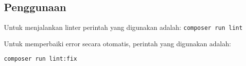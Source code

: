 \subsection{Penggunaan}
Untuk menjalankan linter perintah yang digunakan adalah:
	\verb|composer run lint|    

Untuk memperbaiki error secara otomatis, perintah yang digunakan adalah:

	\verb|composer run lint:fix|    

\begin{comment}
\subsection{Tabel}  
Berikut adalah contoh pembuatan tabel. 
Penempatan tabel dan gambar secara umum diatur secara otomatis oleh \LaTeX{}, perhatikan contoh di file bab2.tex untuk melihat bagaimana cara memaksa tabel ditempatkan sesuai keinginan kita.

Perhatikan bawa berbeda dengan penempatan judul gambar gambar, keterangan tabel harus diletakkan di atas tabel!!
Lihat Tabel~\ref{tab:contoh1} berikut ini:

\begin{table}[H] %
	\centering 
	\caption{Tabel contoh}
	\label{tab:contoh1}
	\begin{tabular}{cccc}
		\toprule
		& $v_{start}$ & $\mathcal{S}_{1}$ & $v_{end}$\\

		\midrule
		$\tau_{1}$ & 1 & 12& 20\\
		$\tau_{2}$ & 1 &  & 20\\
		$\tau_{3}$ & 1 & 9 & 20\\
		$\tau_{4}$ & 1 &  & 20\\

		\bottomrule
		
	\end{tabular} 
\end{table}
Tabel~\ref{tab:cthwarna1} dan Tabel~\ref{tab:cthwarna2} berikut ini adalah tabel dengan sel yang berwarna dan ada dua tabel yang bersebelahan. 
\begin{table}[H]
	\begin{minipage}[c]{0.49\linewidth}
		\centering
		\caption{Tabel bewarna(1)}
		\label{tab:cthwarna1}
		\begin{tabular}{ccccc}
			\toprule
			 & $v_{start}$ & $\mathcal{S}_{2}$ & $\mathcal{S}_{1}$ & $v_{end}$\\
			

\end{comment}
